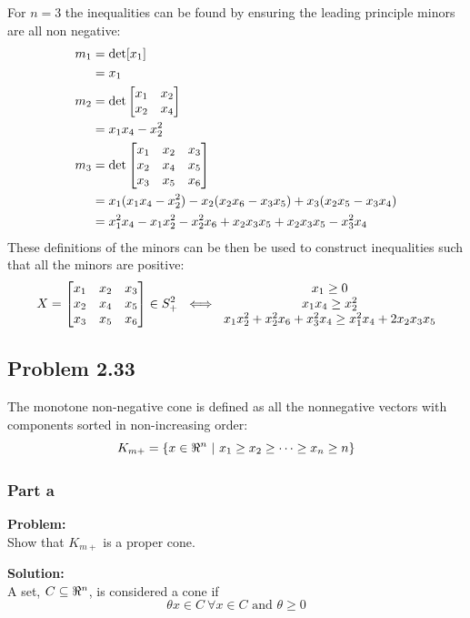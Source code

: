 \documentclass[letter]{article}
\begin{document}
For $n=3$ the inequalities can be found by ensuring the leading principle minors are all non negative:
\begin{equation}
	\begin{aligned}
		m_1 &= \det[x_1]\\
		&= x_1\\
		m_2 &= \det \mqty[x_1 & x_2 \\ x_2 & x_4] \\
		&= x_1 x_4 - x_2^2\\
		m_3 &= \det \mqty[x_1 & x_2 & x_3\\ x_2 & x_4 & x_5\\ x_3 & x_5 & x_6]\\
		&= x_1 (x_1 x_4 - x_2^2) - x_2 (x_2 x_6 - x_3 x_5) + x_3 (x_2 x_5 - x_3 x_4)\\
		&= x_1^2 x_4 - x_1 x_2^2 - x_2^2 x_6 + x_2 x_3 x_5 + x_2 x_3 x_5 - x_3^2 x_4
	\end{aligned}
\end{equation}
These definitions of the minors can be then be used to construct inequalities such that all the minors are positive:
\begin{equation}
	X = \mqty[x_1 & x_2 & x_3\\ x_2 & x_4 & x_5\\ x_3 & x_5 & x_6] \in S_+^2 \ \iff \ 
	\mqty{x_1 \geq 0\\
			x_1 x_4 \geq x_2^2\\
		 x_1 x_2^2 + x_2^2 x_6 + x_3^2 x_4 \geq x_1^2 x_4 + 2 x_2 x_3 x_5}
\end{equation}

\subsection{Problem 2.33}
The monotone non-negative cone is defined as all the nonnegative vectors with components sorted in non-increasing order:
\begin{equation}
	K_{m+} = \{x \in \real^n \ | \ x_1 \geq x_2 \geq \cdots \geq x_n \geq n\}
\end{equation}

\subsubsection{Part a}
\textbf{Problem:}\\
Show that $K_{m+}$ is a proper cone.

\noindent
\textbf{Solution:}\\
A set, $C \subseteq \real^n$, is considered a cone if
\begin{equation}
	\theta x \in C \ \forall x \in C \text{ and } \theta \geq 0
\end{equation}
\end{document}
